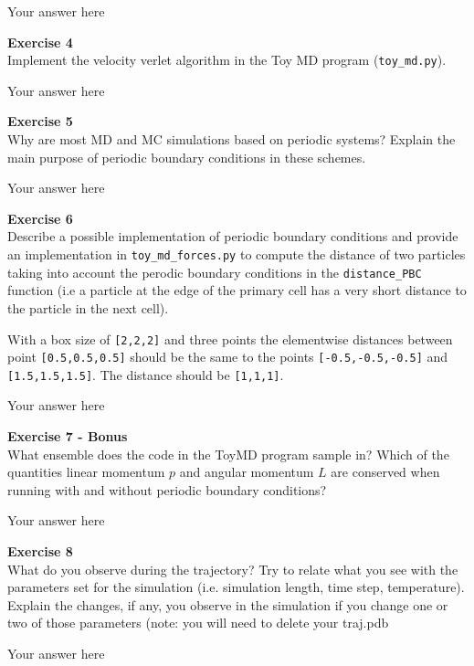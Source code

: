 \documentclass{article}
\begin{document}
Your answer here

\begin{mdframed}
\textbf{Exercise 4}\\
Implement the velocity verlet algorithm in the Toy MD program (\texttt{toy\_md.py}).
\end{mdframed}

Your answer here

\begin{mdframed}
\textbf{Exercise 5}\\
Why are most MD and MC simulations based on periodic systems? Explain the main purpose of periodic boundary conditions in these schemes.
\end{mdframed}

Your answer here

\begin{mdframed}
\textbf{Exercise 6}\\
Describe a possible implementation of periodic boundary conditions and provide an implementation in \texttt{toy\_md\_forces.py} to compute the distance of two particles taking into account the perodic boundary conditions in the \texttt{distance\_PBC} function (i.e a particle at the edge of the primary cell has a very short distance to the particle in the next cell).

With a box size of \texttt{[2,2,2]} and three points the elementwise distances between point \texttt{[0.5,0.5,0.5]} should be the same to the points \texttt{[-0.5,-0.5,-0.5]} and \texttt{[1.5,1.5,1.5]}. The distance should be \texttt{[1,1,1]}.
\end{mdframed}

Your answer here

\begin{mdframed}
\textbf{Exercise 7 - Bonus}\\
What ensemble does the code in the ToyMD program sample in? Which of the quantities linear momentum $p$ and angular momentum $L$ are conserved when running with and without periodic boundary conditions?
\end{mdframed}

Your answer here

\begin{mdframed}
\textbf{Exercise 8}\\
What do you observe during the trajectory? Try to relate what you see with the parameters set for the simulation (i.e. simulation length, time step, temperature). Explain the changes, if any, you observe in the simulation if you change one or two of those parameters (note: you will need to delete your traj.pdb
\end{mdframed}

Your answer here
\end{document}
